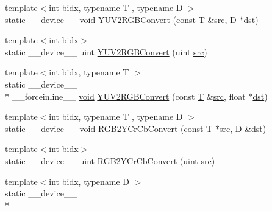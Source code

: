 \begin{DoxyCompactItemize}
\item 
{\footnotesize template$<$int bidx, typename T , typename D $>$ }\\static \-\_\-\-\_\-device\-\_\-\-\_\- \hyperlink{legacy_8hpp_a8bb47f092d473522721002c86c13b94e}{void} \hyperlink{namespacecv_1_1gpu_1_1device_1_1color__detail_a41d9a53c57f1089654ed581f4b1913f6}{Y\-U\-V2\-R\-G\-B\-Convert} (const \hyperlink{calib3d_8hpp_a3efb9551a871ddd0463079a808916717}{T} \&\hyperlink{legacy_8hpp_a371cd109b74033bc4366f584edd3dacc}{src}, D $\ast$\hyperlink{photo__c_8h_aed13e2a25279b24dc954073233fef7a5}{dst})
\item 
{\footnotesize template$<$int bidx$>$ }\\static \-\_\-\-\_\-device\-\_\-\-\_\- uint \hyperlink{namespacecv_1_1gpu_1_1device_1_1color__detail_a6c135f81028a3ee6516e9ed704b2a39a}{Y\-U\-V2\-R\-G\-B\-Convert} (uint \hyperlink{legacy_8hpp_a371cd109b74033bc4366f584edd3dacc}{src})
\item 
{\footnotesize template$<$int bidx, typename T $>$ }\\static \-\_\-\-\_\-device\-\_\-\-\_\- \\*
\-\_\-\-\_\-forceinline\-\_\-\-\_\- \hyperlink{legacy_8hpp_a8bb47f092d473522721002c86c13b94e}{void} \hyperlink{namespacecv_1_1gpu_1_1device_1_1color__detail_a2394dced2f560842991071f0bf1d6be0}{Y\-U\-V2\-R\-G\-B\-Convert} (const \hyperlink{calib3d_8hpp_a3efb9551a871ddd0463079a808916717}{T} \&\hyperlink{legacy_8hpp_a371cd109b74033bc4366f584edd3dacc}{src}, float $\ast$\hyperlink{photo__c_8h_aed13e2a25279b24dc954073233fef7a5}{dst})
\item 
{\footnotesize template$<$int bidx, typename T , typename D $>$ }\\static \-\_\-\-\_\-device\-\_\-\-\_\- \hyperlink{legacy_8hpp_a8bb47f092d473522721002c86c13b94e}{void} \hyperlink{namespacecv_1_1gpu_1_1device_1_1color__detail_ad7a48f57ab89ba955b86b672b967ee13}{R\-G\-B2\-Y\-Cr\-Cb\-Convert} (const \hyperlink{calib3d_8hpp_a3efb9551a871ddd0463079a808916717}{T} $\ast$\hyperlink{legacy_8hpp_a371cd109b74033bc4366f584edd3dacc}{src}, D \&\hyperlink{photo__c_8h_aed13e2a25279b24dc954073233fef7a5}{dst})
\item 
{\footnotesize template$<$int bidx$>$ }\\static \-\_\-\-\_\-device\-\_\-\-\_\- uint \hyperlink{namespacecv_1_1gpu_1_1device_1_1color__detail_a786cf6b3f4e247704b5b5f218ffce8ec}{R\-G\-B2\-Y\-Cr\-Cb\-Convert} (uint \hyperlink{legacy_8hpp_a371cd109b74033bc4366f584edd3dacc}{src})
\item 
{\footnotesize template$<$int bidx, typename D $>$ }\\static \-\_\-\-\_\-device\-\_\-\-\_\- \\*

\end{DoxyCompactItemize}
